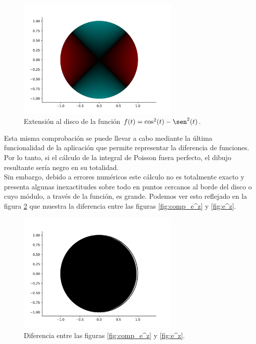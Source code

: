 \begin{figure}[!htbp]
    \centering
    \includegraphics[width=0.7\textwidth]{../Aplicacion/cos^2(t)-sen^2(t).png}
    \caption{Extensión al disco de la función $f(t) = \cos^2(t) - \sen^2(t)$.}
    \label{fig:comparacion4}
\end{figure}

Esta misma comprobación se puede llevar a cabo mediante la última funcionalidad de la aplicación que permite representar la diferencia de funciones. Por lo tanto, si el cálculo de la integral de Poisson fuera perfecto, el dibujo resultante sería negro en su totalidad. \\

Sin embargo, debido a errores numéricos este cálculo no es totalmente exacto y presenta algunas inexactitudes sobre todo en puntos cercanos al borde del disco o cuyo módulo, a través de la función, es grande. Podemos ver esto reflejado en la figura \ref{fig:diferencia} que muestra la diferencia entre las figuras \ref{fig:comp_e^z} y \ref{fig:e^z}. \\

\begin{figure}[!htbp]
    \centering
    \includegraphics[width=0.7\textwidth]{../Aplicacion/diff_e^z.png}
    \caption{Diferencia entre las figuras \ref{fig:comp_e^z} y \ref{fig:e^z}.}
    \label{fig:diferencia}
\end{figure}

